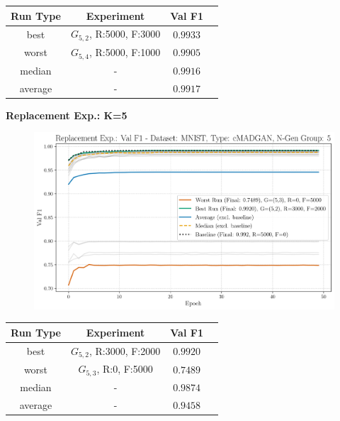 \begin{table}[H]
	\vspace{-1em}
	\centering
	\begin{tabular}{|c|c|c|c|}
		\hline
		Run Type & Experiment & Val F1 \\ \hline
		best & \(G_{5, 2}\), R:5000, F:3000 & $0.9933$\\ \hline
		worst & \(G_{5, 4}\), R:5000, F:1000 & $0.9905$\\ \hline
		median & - & $0.9916$\\ \hline
		average & - & $0.9917$
		\\ \hline
	\end{tabular}
\end{table}
\noindent\textbf{Replacement Exp.: K=5}
\begin{figure}[htbp]
	\centering
	\includegraphics[width=.85\textwidth]{abb/strat_classifier_performance/MNIST_STRATIFIED_CLASSIFIERS_cMADGAN_NEW/replacement_experiments/val_f1_score_cMADGAN_MNIST_n_gen_5_all.png}
	\label{fig:app_strat_class_performance_replacement_exp._val_f1_score_5}
\end{figure}
\begin{table}[H]
	\vspace{-1em}
	\centering
	\begin{tabular}{|c|c|c|c|}
		\hline
		Run Type & Experiment & Val F1 \\ \hline
		best & \(G_{5, 2}\), R:3000, F:2000 & $0.9920$\\ \hline
		worst & \(G_{5, 3}\), R:0, F:5000 & $0.7489$\\ \hline
		median & - & $0.9874$\\ \hline
		average & - & $0.9458$
		\\ \hline
	\end{tabular}
\end{table}
